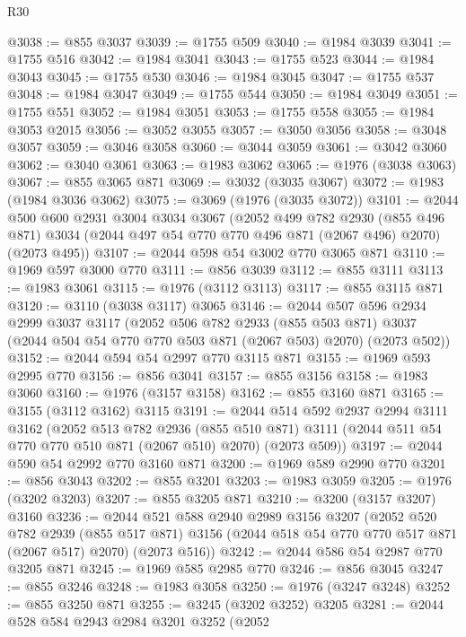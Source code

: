 \begin{lexlean}{R30}
\begin{coremodule}
@3038 := @855 @3037
@3039 := @1755 @509
@3040 := @1984 @3039
@3041 := @1755 @516
@3042 := @1984 @3041
@3043 := @1755 @523
@3044 := @1984 @3043
@3045 := @1755 @530
@3046 := @1984 @3045
@3047 := @1755 @537
@3048 := @1984 @3047
@3049 := @1755 @544
@3050 := @1984 @3049
@3051 := @1755 @551
@3052 := @1984 @3051
@3053 := @1755 @558
@3055 := @1984 @3053 @2015
@3056 := @3052 @3055
@3057 := @3050 @3056
@3058 := @3048 @3057
@3059 := @3046 @3058
@3060 := @3044 @3059
@3061 := @3042 @3060
@3062 := @3040 @3061
@3063 := @1983 @3062
@3065 := @1976 (@3038 @3063)
@3067 := @855 @3065 @871
@3069 := @3032 (@3035 @3067)
@3072 := @1983 (@1984 @3036 @3062)
@3075 := @3069 (@1976 (@3035 @3072))
@3101 := @2044
    @500
    @600
    @2931
    @3004
    @3034
    @3067
    (@2052
      @499
      @782
      @2930
      (@855 @496 @871)
      @3034
      (@2044 @497 @54 @770 @770 @496 @871 (@2067 @496) @2070)
      (@2073 @495))
@3107 := @2044 @598 @54 @3002 @770 @3065 @871
@3110 := @1969 @597 @3000 @770
@3111 := @856 @3039
@3112 := @855 @3111
@3113 := @1983 @3061
@3115 := @1976 (@3112 @3113)
@3117 := @855 @3115 @871
@3120 := @3110 (@3038 @3117) @3065
@3146 := @2044
    @507
    @596
    @2934
    @2999
    @3037
    @3117
    (@2052
      @506
      @782
      @2933
      (@855 @503 @871)
      @3037
      (@2044 @504 @54 @770 @770 @503 @871 (@2067 @503) @2070)
      (@2073 @502))
@3152 := @2044 @594 @54 @2997 @770 @3115 @871
@3155 := @1969 @593 @2995 @770
@3156 := @856 @3041
@3157 := @855 @3156
@3158 := @1983 @3060
@3160 := @1976 (@3157 @3158)
@3162 := @855 @3160 @871
@3165 := @3155 (@3112 @3162) @3115
@3191 := @2044
    @514
    @592
    @2937
    @2994
    @3111
    @3162
    (@2052
      @513
      @782
      @2936
      (@855 @510 @871)
      @3111
      (@2044 @511 @54 @770 @770 @510 @871 (@2067 @510) @2070)
      (@2073 @509))
@3197 := @2044 @590 @54 @2992 @770 @3160 @871
@3200 := @1969 @589 @2990 @770
@3201 := @856 @3043
@3202 := @855 @3201
@3203 := @1983 @3059
@3205 := @1976 (@3202 @3203)
@3207 := @855 @3205 @871
@3210 := @3200 (@3157 @3207) @3160
@3236 := @2044
    @521
    @588
    @2940
    @2989
    @3156
    @3207
    (@2052
      @520
      @782
      @2939
      (@855 @517 @871)
      @3156
      (@2044 @518 @54 @770 @770 @517 @871 (@2067 @517) @2070)
      (@2073 @516))
@3242 := @2044 @586 @54 @2987 @770 @3205 @871
@3245 := @1969 @585 @2985 @770
@3246 := @856 @3045
@3247 := @855 @3246
@3248 := @1983 @3058
@3250 := @1976 (@3247 @3248)
@3252 := @855 @3250 @871
@3255 := @3245 (@3202 @3252) @3205
@3281 := @2044
    @528
    @584
    @2943
    @2984
    @3201
    @3252
    (@2052

\end{coremodule}
\end{lexlean}
